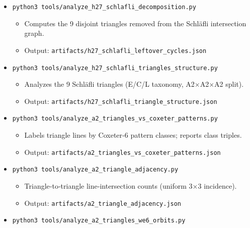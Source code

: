 \documentclass[11pt]{article}
\providecommand{\tightlist}{%
  \setlength{\itemsep}{0pt}\setlength{\parskip}{0pt}}
\begin{document}
\begin{itemize}
  \begin{itemize}
  \tightlist
  \item
    Finds an H27 edge‑subset embedding into the Schläfli intersection
    graph.
  \item
    Output: \texttt{artifacts/h27\_in\_schlafli\_intersection.json}
  \end{itemize}
\item
  \texttt{python3\ tools/analyze\_h27\_schlafli\_decomposition.py}

  \begin{itemize}
  \tightlist
  \item
    Computes the 9 disjoint triangles removed from the Schläfli
    intersection graph.
  \item
    Output: \texttt{artifacts/h27\_schlafli\_leftover\_cycles.json}
  \end{itemize}
\item
  \texttt{python3\ tools/analyze\_h27\_schlafli\_triangles\_structure.py}

  \begin{itemize}
  \tightlist
  \item
    Analyzes the 9 Schläfli triangles (E/C/L taxonomy,
    A2\ensuremath{\times}A2\ensuremath{\times}A2 split).
  \item
    Output: \texttt{artifacts/h27\_schlafli\_triangle\_structure.json}
  \end{itemize}
\item
  \texttt{python3\ tools/analyze\_a2\_triangles\_vs\_coxeter\_patterns.py}

  \begin{itemize}
  \tightlist
  \item
    Labels triangle lines by Coxeter‑6 pattern classes; reports class
    triples.
  \item
    Output: \texttt{artifacts/a2\_triangles\_vs\_coxeter\_patterns.json}
  \end{itemize}
\item
  \texttt{python3\ tools/analyze\_a2\_triangle\_adjacency.py}

  \begin{itemize}
  \tightlist
  \item
    Triangle‑to‑triangle line‑intersection counts (uniform
    3\ensuremath{\times}3 incidence).
  \item
    Output: \texttt{artifacts/a2\_triangle\_adjacency.json}
  \end{itemize}
\item
  \texttt{python3\ tools/analyze\_a2\_triangles\_we6\_orbits.py}


\end{itemize}
\end{document}
